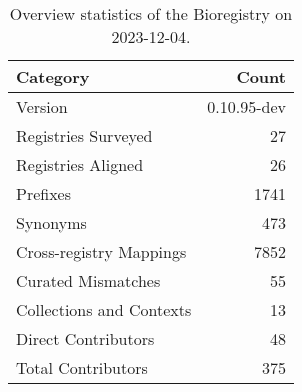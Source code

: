 \begin{table}
\caption{Overview statistics of the Bioregistry on 2023-12-04.}
\label{tab:bioregistry-summary}
\begin{tabular}{lr}
\toprule
Category & Count \\
\midrule
Version & 0.10.95-dev \\
Registries Surveyed & 27 \\
Registries Aligned & 26 \\
Prefixes & 1741 \\
Synonyms & 473 \\
Cross-registry Mappings & 7852 \\
Curated Mismatches & 55 \\
Collections and Contexts & 13 \\
Direct Contributors & 48 \\
Total Contributors & 375 \\
\bottomrule
\end{tabular}
\end{table}
